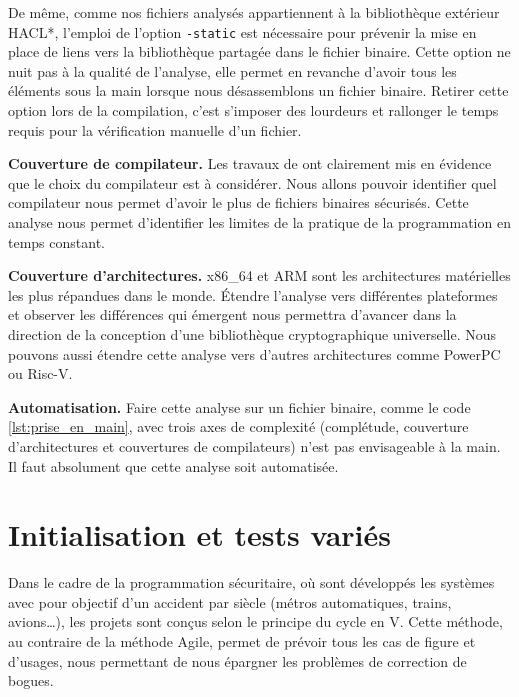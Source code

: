 De même, comme nos fichiers analysés appartiennent à la bibliothèque extérieur HACL*, l'emploi de l'option \texttt{-static} est nécessaire pour prévenir la mise en place de liens vers la bibliothèque partagée dans le fichier binaire. Cette option ne nuit pas à la qualité de l'analyse, elle permet en revanche d'avoir tous les éléments sous la main lorsque nous désassemblons un fichier binaire. Retirer cette option lors de la compilation, c'est s'imposer des lourdeurs et rallonger le temps requis pour la vérification manuelle d'un fichier.\medbreak

\textbf{Couverture de compilateur.} Les travaux de \citeauthor{schneider2024breakingbadcompilersbreak} \cite{schneider2024breakingbadcompilersbreak} ont clairement mis en évidence que le choix du compilateur est à considérer. Nous allons pouvoir identifier quel compilateur nous permet d'avoir le plus de fichiers binaires sécurisés. Cette analyse nous permet d'identifier les limites de la pratique de la programmation en temps constant.

\textbf{Couverture d'architectures.} x86\_64 et ARM sont les architectures matérielles les plus répandues dans le monde. Étendre l'analyse vers différentes plateformes et observer les différences qui émergent nous permettra d'avancer dans la direction de la conception d'une bibliothèque cryptographique universelle. Nous pouvons aussi étendre cette analyse vers d'autres architectures comme PowerPC ou Risc-V.\medbreak


\textbf{Automatisation.} Faire cette analyse sur un fichier binaire, comme le code \ref{lst:prise_en_main}, avec trois axes de complexité (complétude, couverture d'architectures et couvertures de compilateurs) n'est pas envisageable à la main. Il faut absolument que cette analyse soit automatisée.


\section{Initialisation et tests variés}

Dans le cadre de la programmation sécuritaire, où sont développés les systèmes avec pour objectif d'un accident par siècle (métros automatiques, trains, avions\dots), les projets sont conçus selon le principe du cycle en V. Cette méthode, au contraire de la méthode Agile, permet de prévoir tous les cas de figure et d'usages, nous permettant de nous épargner les problèmes de correction de bogues.

